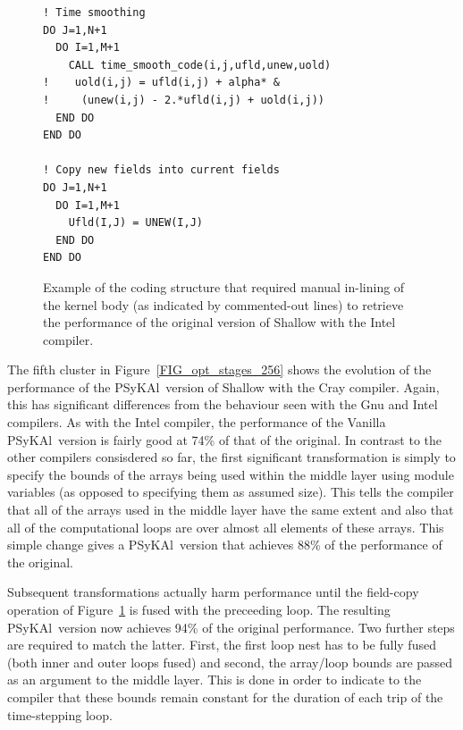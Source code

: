 \documentclass{IOS-Book-Article}
\newcommand{\psykal}{{PS}y{KA}l\ }
\begin{document}
\begin{figure}
\begin{verbatim}
! Time smoothing
DO J=1,N+1
  DO I=1,M+1
    CALL time_smooth_code(i,j,ufld,unew,uold)
!    uold(i,j) = ufld(i,j) + alpha* &
!     (unew(i,j) - 2.*ufld(i,j) + uold(i,j))
  END DO
END DO

! Copy new fields into current fields
DO J=1,N+1
  DO I=1,M+1
    Ufld(I,J) = UNEW(I,J)
  END DO
END DO
\end{verbatim}
\caption{Example of the coding structure that required manual
  in-lining of the kernel body (as indicated by commented-out lines)
  to retrieve the performance of the original version of Shallow with
  the Intel compiler.}
\label{FIG_time_smooth_code}
\end{figure}

The fifth cluster in Figure~\ref{FIG_opt_stages_256} shows the
evolution of the performance of the \psykal version of Shallow with
the Cray compiler. Again, this has significant differences from the
behaviour seen with the Gnu and Intel compilers. As with the Intel
compiler, the performance of the Vanilla \psykal version is fairly
good at 74\% of that of the original. In contrast to the other
compilers consisdered so far, the first significant transformation is
simply to specify the bounds of the arrays being used within the
middle layer using module variables (as opposed to specifying them as
assumed size). This tells the compiler that all of the arrays used in
the middle layer have the same extent and also that all of the
computational loops are over almost all elements of these arrays. This
simple change gives a \psykal version that achieves 88\% of the
performance of the original.

Subsequent transformations actually harm performance until the
field-copy operation of Figure~\ref{FIG_time_smooth_code} is fused
with the preceeding loop. The resulting \psykal version now achieves
94\% of the original performance. Two further steps are required to
match the latter. First, the first loop nest has to be fully fused
(both inner and outer loops fused) and second, the array/loop bounds
are passed as an argument to the middle layer. This is done in order
to indicate to the compiler that these bounds remain constant for the
duration of each trip of the time-stepping loop.
\end{document}
